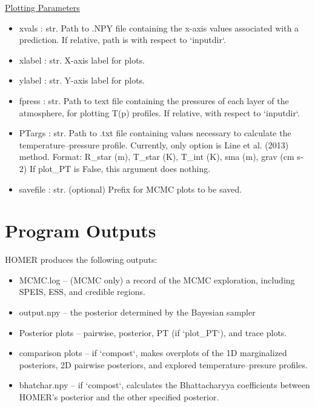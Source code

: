 \documentclass[letterpaper, 12pt]{article}
\begin{document}
\noindent \underline{Plotting Parameters}
\begin{itemize}
\item xvals      : str.  Path to .NPY file containing the x-axis values 
                         associated with a prediction.
                         If relative, path is with respect to `inputdir`.
\item xlabel     : str.  X-axis label for plots.
\item ylabel     : str.  Y-axis label for plots.
\item fpress     : str.  Path to text file containing the pressures of each 
                         layer of the atmosphere, for plotting T(p) profiles.
                         If relative, with respect to `inputdir`.
\item PTargs     : str.  Path to .txt file containing values necessary to 
                   calculate the temperature--pressure profile.
                   Currently, only option is Line et al. (2013) method.
                   Format: R_star (m), T_star (K), T_int (K), 
                           sma (m), grav (cm s-2)
                   If plot_PT is False, this argument does nothing.
\item savefile   : str.  (optional) Prefix for MCMC plots to be saved.
\end{itemize}



\section{Program Outputs}
\label{sec:outputs}

HOMER produces the following outputs:

\begin{itemize}
\item MCMC.log -- (MCMC only) a record of the MCMC exploration, including SPEIS, ESS, and 
                  credible regions.
\item output.npy -- the posterior determined by the Bayesian sampler
\item Posterior plots -- pairwise, posterior, PT (if `plot\_PT`), and trace plots.
\item comparison plots -- if `compost`, makes overplots of the 1D marginalized 
                          posteriors, 2D pairwise posteriors, and explored 
                          temperature--presure profiles.
\item bhatchar.npy -- if `compost`, calculates the Bhattacharyya coefficients 
                      between HOMER's posterior and the other specified 
                      posterior.
\end{itemize}
\end{document}
